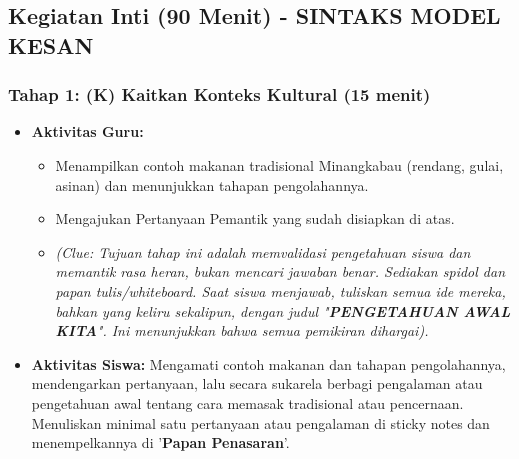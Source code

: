 \documentclass[a4paper,12pt]{article}
\begin{document}
\subsection{Kegiatan Inti (90 Menit) - SINTAKS MODEL KESAN}

\subsubsection{Tahap 1: (K) Kaitkan Konteks Kultural (15 menit)}
\begin{itemize}
\item \textbf{Aktivitas Guru:}
    \begin{itemize}
    \item Menampilkan contoh makanan tradisional Minangkabau (rendang, gulai, asinan) dan menunjukkan tahapan pengolahannya.
    \item Mengajukan Pertanyaan Pemantik yang sudah disiapkan di atas.
    \item \textit{(Clue: Tujuan tahap ini adalah memvalidasi pengetahuan siswa dan memantik rasa heran, bukan mencari jawaban benar. Sediakan spidol dan papan tulis/whiteboard. Saat siswa menjawab, tuliskan semua ide mereka, bahkan yang keliru sekalipun, dengan judul "\textbf{PENGETAHUAN AWAL KITA}". Ini menunjukkan bahwa semua pemikiran dihargai).}
    \end{itemize}
\item \textbf{Aktivitas Siswa:} Mengamati contoh makanan dan tahapan pengolahannya, mendengarkan pertanyaan, lalu secara sukarela berbagi pengalaman atau pengetahuan awal tentang cara memasak tradisional atau pencernaan. Menuliskan minimal satu pertanyaan atau pengalaman di sticky notes dan menempelkannya di '\textbf{Papan Penasaran}'.
\end{itemize}
\end{document}
